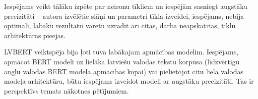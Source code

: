 Iespējams veikt tālāku izpēte par neironu tīkliem un iespējām sasniegt augstāku precizitāti – autora izvēlētie slāņi un parametri tīkla izveidei, iespējams, nebija optimāli, labāku rezultātu varētu uzrādīt arī citas, darbā neapskatītas, tīklu arhitektūras pieejas.

LVBERT veiktspēja bija ļoti tuva labākajam apmācības modelim. Iespējams, apmācot BERT modeli uz lielāka latviešu valodas tekstu korpusa (līdzvērtīgu angļu valodas BERT modeļa apmācības kopai) vai pielietojot citu lielā valodas modeļa arhitektūru, būtu iespējams izveidot modeli ar augstāku precizitāti. Tas ir perspektīvs temats nākotnes pētījumiem.